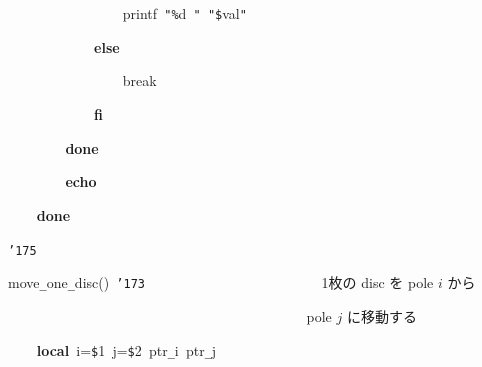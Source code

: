 \documentclass[a4paper,10pt]{article}
\def\mc{\relax}
\begin{document}
\noindent
\mbox{}{\tt\mc \ }{\tt\mc \ }{\tt\mc \ }{\tt\mc \ }{\tt\mc \ }{\tt\mc \ }{\tt\mc \ }{\tt\mc \ }{\tt\mc \ }{\tt\mc \ }{\tt\mc \ }{\tt\mc \ }{\tt\mc \ }{\tt\mc \ }{\tt\mc \ }{\tt\mc \ }printf{\tt\mc \ }{\tt "}{\tt\%}d{\tt\mc \ }{\tt "}{\tt\mc \ }{\tt "}{\tt\$}val{\tt "}

\noindent
\mbox{}{\tt\mc \ }{\tt\mc \ }{\tt\mc \ }{\tt\mc \ }{\tt\mc \ }{\tt\mc \ }{\tt\mc \ }{\tt\mc \ }{\tt\mc \ }{\tt\mc \ }{\tt\mc \ }{\tt\mc \ }\textbf{else}

\noindent
\mbox{}{\tt\mc \ }{\tt\mc \ }{\tt\mc \ }{\tt\mc \ }{\tt\mc \ }{\tt\mc \ }{\tt\mc \ }{\tt\mc \ }{\tt\mc \ }{\tt\mc \ }{\tt\mc \ }{\tt\mc \ }{\tt\mc \ }{\tt\mc \ }{\tt\mc \ }{\tt\mc \ }break

\noindent
\mbox{}{\tt\mc \ }{\tt\mc \ }{\tt\mc \ }{\tt\mc \ }{\tt\mc \ }{\tt\mc \ }{\tt\mc \ }{\tt\mc \ }{\tt\mc \ }{\tt\mc \ }{\tt\mc \ }{\tt\mc \ }\textbf{fi}

\noindent
\mbox{}{\tt\mc \ }{\tt\mc \ }{\tt\mc \ }{\tt\mc \ }{\tt\mc \ }{\tt\mc \ }{\tt\mc \ }{\tt\mc \ }\textbf{done}

\noindent
\mbox{}{\tt\mc \ }{\tt\mc \ }{\tt\mc \ }{\tt\mc \ }{\tt\mc \ }{\tt\mc \ }{\tt\mc \ }{\tt\mc \ }\textbf{echo}

\noindent
\mbox{}{\tt\mc \ }{\tt\mc \ }{\tt\mc \ }{\tt\mc \ }\textbf{done}

\noindent
\mbox{}{\tt\char'175}

\noindent
\mbox{}\hfill

\noindent
\mbox{}move{\tt\_}one{\tt\_}disc(){\tt\mc \ }{\tt\char'173}{\tt\mc \ }{\tt\mc \ }{\tt\mc \ }{\tt\mc \ }{\tt\mc \ }{\tt\mc \ }{\tt\mc \ }{\tt\mc \ }{\tt\mc \ }{\tt\mc \ }{\tt\mc \ }{\tt\mc \ }{\tt\mc \ }{\tt\mc \ }{\tt\mc \ }{\tt\mc \ }{\tt\mc \ }{\tt\mc \ }{\tt\mc \ }{\tt\mc \ }{\tt\mc \ }{\tt\mc \ }{\tt\mc \ }\rm\mc {\tt\#} \ 1枚の disc を pole $i$ から\hfill 
\tt\mc 

\noindent
\mbox{}{\tt\mc \ }{\tt\mc \ }{\tt\mc \ }{\tt\mc \ }{\tt\mc \ }{\tt\mc \ }{\tt\mc \ }{\tt\mc \ }{\tt\mc \ }{\tt\mc \ }{\tt\mc \ }{\tt\mc \ }{\tt\mc \ }{\tt\mc \ }{\tt\mc \ }{\tt\mc \ }{\tt\mc \ }{\tt\mc \ }{\tt\mc \ }{\tt\mc \ }{\tt\mc \ }{\tt\mc \ }{\tt\mc \ }{\tt\mc \ }{\tt\mc \ }{\tt\mc \ }{\tt\mc \ }{\tt\mc \ }{\tt\mc \ }{\tt\mc \ }{\tt\mc \ }{\tt\mc \ }{\tt\mc \ }{\tt\mc \ }{\tt\mc \ }{\tt\mc \ }{\tt\mc \ }{\tt\mc \ }{\tt\mc \ }{\tt\mc \ }\rm\mc {\tt\#} \ pole $j$ に移動する \hfill 
\tt\mc 

\noindent
\mbox{}{\tt\mc \ }{\tt\mc \ }{\tt\mc \ }{\tt\mc \ }\textbf{local}{\tt\mc \ }i={\tt\$}1{\tt\mc \ }j={\tt\$}2{\tt\mc \ }ptr{\tt\_}i{\tt\mc \ }ptr{\tt\_}j
\end{document}
